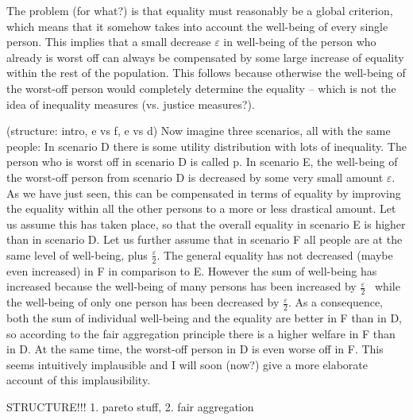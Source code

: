 The problem (for what?) is that equality must reasonably be a global criterion, which means that it somehow takes into account the well-being of every single person. This implies that a small decrease $\varepsilon $ in well-being of the person who already is worst off can always be compensated by some large increase of equality within the rest of the population. This follows because otherwise the well-being of the worst-off person would completely determine the equality – which is not the idea of inequality measures (vs. justice measures?).  

(structure: intro, e vs f, e vs d) Now imagine three scenarios, all with the same people: In scenario D there is some utility distribution with lots of inequality. The person who is worst off in scenario D is called p. In scenario E, the well-being of the worst-off person from scenario D is decreased by some very small amount $\varepsilon $. As we have just seen, this can be compensated in terms of equality by improving the equality within all the other persons to a more or less drastical amount. Let us assume this has taken place, so that the overall equality in scenario E is higher than in scenario D. Let us further assume that in scenario F all people are at the same level of well-being, plus  $\frac{\varepsilon } 2$. The general equality has not decreased (maybe even increased) in F in comparison to E. However the sum of well-being has increased because the well-being of many persons has been increased by  $\frac{\varepsilon } 2$ \ while the well-being of only one person has been decreased by  $\frac{\varepsilon } 2$. As a consequence, both the sum of individual well-being and the equality are better in F than in D, so according to the fair aggregation principle there is a higher welfare in F than in D. At the same time, the worst-off person in D is even worse off in F. This seems intuitively implausible and I will soon (now?) give a more elaborate account of this implausibility.  

STRUCTURE!!! 1. pareto stuff, 2. fair aggregation 


